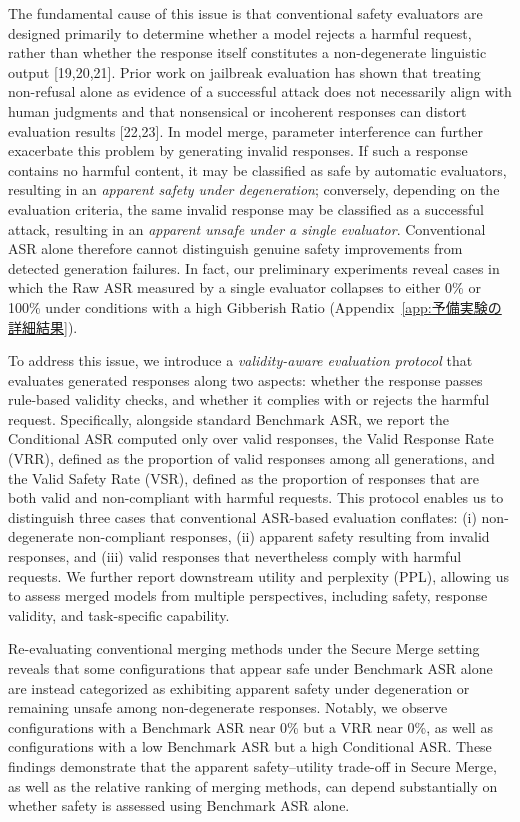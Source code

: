 \documentclass{article}
\begin{document}
The fundamental cause of this issue is that conventional safety evaluators are designed primarily to determine whether a model rejects a harmful request, rather than whether the response itself constitutes a non-degenerate linguistic output [19,20,21]. Prior work on jailbreak evaluation has shown that treating non-refusal alone as evidence of a successful attack does not necessarily align with human judgments and that nonsensical or incoherent responses can distort evaluation results [22,23]. In model merge, parameter interference can further exacerbate this problem by generating invalid responses. If such a response contains no harmful content, it may be classified as safe by automatic evaluators, resulting in an \textit{apparent safety under degeneration}; conversely, depending on the evaluation criteria, the same invalid response may be classified as a successful attack, resulting in an \textit{apparent unsafe under a single evaluator}. Conventional ASR alone therefore cannot distinguish genuine safety improvements from detected generation failures. In fact, our preliminary experiments reveal cases in which the Raw ASR measured by a single evaluator collapses to either 0\% or 100\% under conditions with a high Gibberish Ratio (Appendix~\ref{app:予備実験の詳細結果}).

To address this issue, we introduce a \textit{validity-aware evaluation protocol} that evaluates generated responses along two aspects: whether the response passes rule-based validity checks, and whether it complies with or rejects the harmful request. Specifically, alongside standard Benchmark ASR, we report the Conditional ASR computed only over valid responses, the Valid Response Rate (VRR), defined as the proportion of valid responses among all generations, and the Valid Safety Rate (VSR), defined as the proportion of responses that are both valid and non-compliant with harmful requests. This protocol enables us to distinguish three cases that conventional ASR-based evaluation conflates: (i) non-degenerate non-compliant responses, (ii) apparent safety resulting from invalid responses, and (iii) valid responses that nevertheless comply with harmful requests. We further report downstream utility and perplexity (PPL), allowing us to assess merged models from multiple perspectives, including safety, response validity, and task-specific capability.

Re-evaluating conventional merging methods under the Secure Merge setting reveals that some configurations that appear safe under Benchmark ASR alone are instead categorized as exhibiting apparent safety under degeneration or remaining unsafe among non-degenerate responses. Notably, we observe configurations with a Benchmark ASR near 0\% but a VRR near 0\%, as well as configurations with a low Benchmark ASR but a high Conditional ASR. These findings demonstrate that the apparent safety--utility trade-off in Secure Merge, as well as the relative ranking of merging methods, can depend substantially on whether safety is assessed using Benchmark ASR alone.
\end{document}
